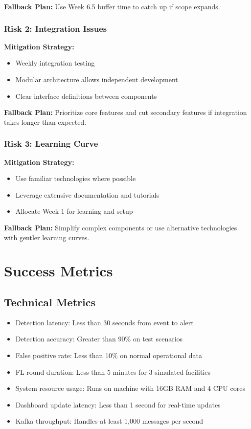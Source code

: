 \documentclass[12pt,a4paper]{article}
\begin{document}
\textbf{Fallback Plan:}
Use Week 6.5 buffer time to catch up if scope expands.

\subsubsection{Risk 2: Integration Issues}

\textbf{Mitigation Strategy:}
\begin{itemize}[leftmargin=1cm,itemsep=0pt]
    \item Weekly integration testing
    \item Modular architecture allows independent development
    \item Clear interface definitions between components
\end{itemize}

\textbf{Fallback Plan:}
Prioritize core features and cut secondary features if integration takes longer than expected.

\subsubsection{Risk 3: Learning Curve}

\textbf{Mitigation Strategy:}
\begin{itemize}[leftmargin=1cm,itemsep=0pt]
    \item Use familiar technologies where possible
    \item Leverage extensive documentation and tutorials
    \item Allocate Week 1 for learning and setup
\end{itemize}

\textbf{Fallback Plan:}
Simplify complex components or use alternative technologies with gentler learning curves.

\section{Success Metrics}

\subsection{Technical Metrics}

\begin{itemize}[leftmargin=1cm,itemsep=0pt]
    \item Detection latency: Less than 30 seconds from event to alert
    \item Detection accuracy: Greater than 90\% on test scenarios
    \item False positive rate: Less than 10\% on normal operational data
    \item FL round duration: Less than 5 minutes for 3 simulated facilities
    \item System resource usage: Runs on machine with 16GB RAM and 4 CPU cores
    \item Dashboard update latency: Less than 1 second for real-time updates
    \item Kafka throughput: Handles at least 1,000 messages per second
\end{itemize}
\end{document}
